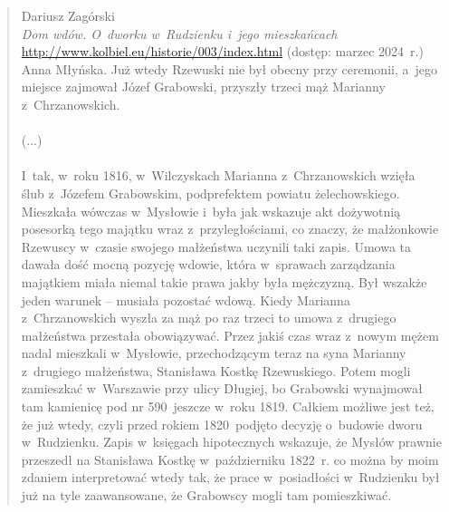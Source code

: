 \begin{quote}{Dariusz Zagórski \\ \null\hfill \emph{Dom wdów. O~dworku 
    w~Rudzienku i~jego mieszkańcach} \\ \null\hfill 
    \url{http://www.kolbiel.eu/historie/003/index.html} (dostęp: marzec 
    2024~r.)}
{Anna Młyńska. Już wtedy Rzewuski nie był obecny przy ceremonii, a~jego 
miejsce zajmował Józef Grabowski, przyszły trzeci mąż Marianny 
z~Chrzanowskich.
\\
\\
(...)
\\
\\
I~tak, w~roku 1816, w~Wilczyskach Marianna z~Chrzanowskich wzięła ślub 
z~Józefem Grabowskim, podprefektem powiatu żelechowskiego. Mieszkała wówczas 
w~Mysłowie i~była jak wskazuje akt dożywotnią posesorką tego majątku wraz 
z~przyległościami, co znaczy, że małżonkowie Rzewuscy w~czasie swojego 
małżeństwa uczynili taki zapis. Umowa ta dawała dość mocną pozycję wdowie, 
która w~sprawach zarządzania majątkiem miała niemal takie prawa jakby była 
mężczyzną. Był wszakże jeden warunek – musiała pozostać wdową. Kiedy Marianna 
z~Chrzanowskich wyszła za mąż po raz trzeci to umowa z~drugiego małżeństwa 
przestała obowiązywać. Przez jakiś czas wraz z~nowym mężem nadal mieszkali 
w~Mysłowie, przechodzącym teraz na syna Marianny z~drugiego małżeństwa, 
Stanisława Kostkę Rzewuskiego. Potem mogli zamieszkać w~Warszawie przy ulicy 
Długiej, bo Grabowski wynajmował tam kamienicę pod nr 590~jeszcze w~roku 
1819. Całkiem możliwe jest też, że już wtedy, czyli przed rokiem 1820~podjęto 
decyzję o~budowie dworu w~Rudzienku. Zapis w~księgach hipotecznych wskazuje, 
że Mysłów prawnie przeszedł na Stanisława Kostkę w~październiku 1822~r. co 
można by moim zdaniem interpretować wtedy tak, że prace w~posiadłości 
w~Rudzienku był już na tyle zaawansowane, że Grabowscy mogli tam 
pomieszkiwać.}
\end{quote}

